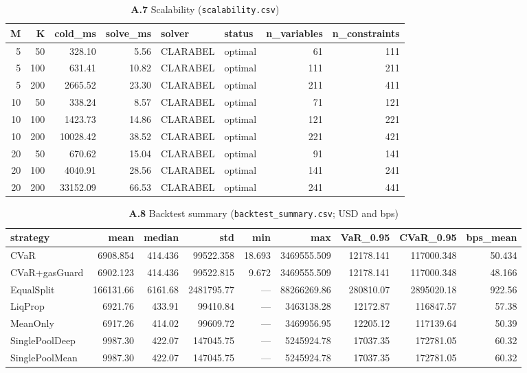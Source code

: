 \documentclass[11pt,a4paper]{article}
\theoremstyle{remark}
\newcommand{\code}[1]{\texttt{#1}}
\begin{document}
\begin{landscape}
\begin{table}[H]
\centering
\caption*{\textbf{A.7} Scalability (\code{scalability.csv})}
\scriptsize
\begin{tabular}{@{}rrrrllrr@{}}
\toprule
M & K & cold\_ms & solve\_ms & solver & status & n\_variables & n\_constraints \\
\midrule
5 & 50 & 328.10 & 5.56 & CLARABEL & optimal & 61 & 111 \\
5 & 100 & 631.41 & 10.82 & CLARABEL & optimal & 111 & 211 \\
5 & 200 & 2665.52 & 23.30 & CLARABEL & optimal & 211 & 411 \\
10 & 50 & 338.24 & 8.57 & CLARABEL & optimal & 71 & 121 \\
10 & 100 & 1423.73 & 14.86 & CLARABEL & optimal & 121 & 221 \\
10 & 200 & 10028.42 & 38.52 & CLARABEL & optimal & 221 & 421 \\
20 & 50 & 670.62 & 15.04 & CLARABEL & optimal & 91 & 141 \\
20 & 100 & 4040.91 & 28.56 & CLARABEL & optimal & 141 & 241 \\
20 & 200 & 33152.09 & 66.53 & CLARABEL & optimal & 241 & 441 \\
\bottomrule
\end{tabular}
\end{table}

\begin{table}[H]
\centering
\caption*{\textbf{A.8} Backtest summary (\code{backtest\_summary.csv}; USD and bps)}
\scriptsize
\begin{tabular}{@{}lrrrrrrrr@{}}
\toprule
strategy & mean & median & std & min & max & VaR\_0.95 & CVaR\_0.95 & bps\_mean \\
\midrule
CVaR & 6908.854 & 414.436 & 99522.358 & 18.693 & 3469555.509 & 12178.141 & 117000.348 &
50.434 \\
CVaR+gasGuard & 6902.123 & 414.436 & 99522.815 & 9.672 & 3469555.509 & 12178.141 &
117000.348 & 48.166 \\
EqualSplit & 166131.66 & 6161.68 & 2481795.77 & --- & 88266269.86 & 280810.07 &
2895020.18 & 922.56 \\
LiqProp & 6921.76 & 433.91 & 99410.84 & --- & 3463138.28 & 12172.87 & 116847.57 &
57.38 \\
MeanOnly & 6917.26 & 414.02 & 99609.72 & --- & 3469956.95 & 12205.12 & 117139.64 &
50.39 \\
SinglePoolDeep & 9987.30 & 422.07 & 147045.75 & --- & 5245924.78 & 17037.35 & 172781.05 &
60.32 \\
SinglePoolMean & 9987.30 & 422.07 & 147045.75 & --- & 5245924.78 & 17037.35 & 172781.05 &
60.32 \\
\bottomrule
\end{tabular}
\end{table}


\end{landscape}
\end{document}
